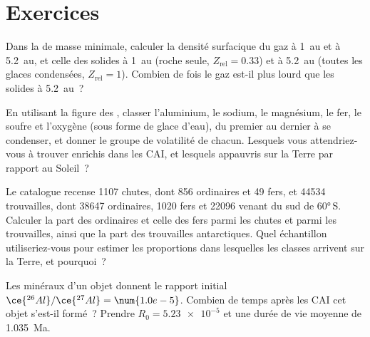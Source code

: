 \section{Exercices}

\begin{exercise}[$\star$]\label{exo:b2:planet-formation-meteorites:1}
Dans la  de masse minimale, calculer la densité surfacique du gaz à
\qty{1}{au} et à \qty{5.2}{au}, et celle des solides à \qty{1}{au} (roche seule,
$Z_{\mathrm{rel}} = 0.33$) et à \qty{5.2}{au} (toutes les glaces condensées,
$Z_{\mathrm{rel}} = 1$). Combien de fois le gaz est-il plus lourd que les solides à
\qty{5.2}{au}~?
\end{exercise}

\begin{exercise}[$\star$]\label{exo:b2:planet-formation-meteorites:2}
En utilisant la figure des , classer l'aluminium, le sodium, le magnésium, le
fer, le soufre et l'oxygène (sous forme de glace d'eau), du premier au dernier à se condenser, et donner le
groupe de volatilité de chacun. Lesquels vous attendriez-vous à trouver enrichis dans les CAI, et lesquels
appauvris sur la Terre par rapport au Soleil~?
\end{exercise}

\begin{exercise}[$\star$]\label{exo:b2:planet-formation-meteorites:3}
Le catalogue recense \num{1107} chutes, dont 856  ordinaires et 49 fers, et
\num{44534} trouvailles, dont \num{38647}  ordinaires, \num{1020} fers et
\num{22096} venant du sud de \ang{60}\,S. Calculer la part des  ordinaires et
celle des fers parmi les chutes et parmi les trouvailles, ainsi que la part des trouvailles
antarctiques. Quel échantillon utiliseriez-vous pour estimer les proportions dans lesquelles
les classes arrivent sur la Terre, et pourquoi~?
\end{exercise}

\begin{exercise}[$\star$]\label{exo:b2:planet-formation-meteorites:4}
Les minéraux d'un objet donnent le rapport initial $\ce{^{26}Al}/\ce{^{27}Al} = \num{1.0e-5}$. Combien de
temps après les CAI cet objet s'est-il formé~? Prendre $R_0 = \num{5.23e-5}$ et une durée de vie moyenne
de \qty{1.035}{Ma}.
\end{exercise}


